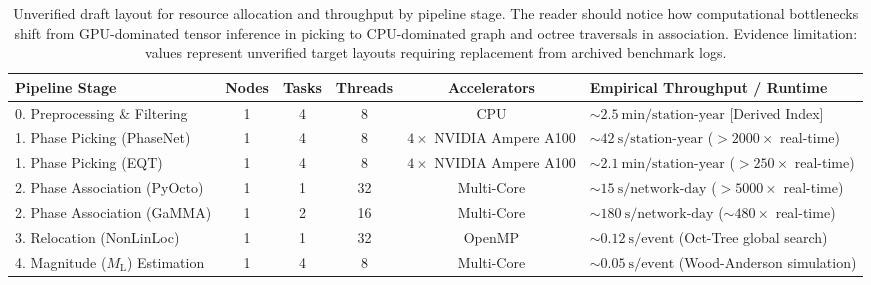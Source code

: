 \begin{landscape}
  \begin{table}[htbp]
    \centering
    \small
    \caption{Unverified draft layout for resource allocation and
      throughput by pipeline stage. The reader should notice how computational
      bottlenecks shift from \ac{GPU}-dominated tensor inference in picking to
      \ac{CPU}-dominated graph and octree traversals in association. Evidence
      limitation: values represent unverified target layouts
      requiring replacement
    from archived benchmark logs.}
    \label{tab:stage_benchmarks}
    \begin{threeparttable}
      \begin{tabularx}{\linewidth}{l c c c c X}
        \toprule
        \textbf{Pipeline Stage} & \textbf{Nodes} & \textbf{Tasks} &
        \textbf{Threads} & \textbf{Accelerators} & \textbf{Empirical
        Throughput / Runtime\tnote{a}} \\
        \midrule
        0. Preprocessing \& Filtering & \num{1} & \num{4} & \num{8}
        & \ac{CPU} & $\sim
        \qty{2.5}{\minute} / \text{station-year}$ [Derived Index] \\
        1. Phase Picking (\ac{PhaseNet}) & \num{1} & \num{4} &
        \num{8} & $\num{4} \times $  NVIDIA Ampere A100 &
        $\sim \qty{42}{\second} / \text{station-year}$ ($> \num{2000} \times $
        real-time) \\
        1. Phase Picking (\ac{EQT}) & \num{1} & \num{4} & \num{8} &
        $\num{4} \times $  NVIDIA Ampere A100
        & $\sim \qty{2.1}{\minute} / \text{station-year}$ ($>
        \num{250} \times $ real-time) \\
        2. Phase Association (\ac{PyOcto}) & \num{1} & \num{1} &
        \num{32} & Multi-Core &
        $\sim \qty{15}{\second} / \text{network-day}$ ($> \num{5000} \times $
        real-time) \\
        2. Phase Association (\ac{GaMMA}) & \num{1} & \num{2} &
        \num{16} & Multi-Core & $\sim
        \qty{180}{\second} / \text{network-day}$ ($\sim \num{480} \times $
        real-time) \\
        3. Relocation (\ac{NonLinLoc}) & \num{1} & \num{1} &
        \num{32} & OpenMP & $\sim
        \qty{0.12}{\second} / \text{event}$ (Oct-Tree global search) \\
        4. Magnitude ($M_{\mathrm{L}}$) Estimation & \num{1} &
        \num{4} & \num{8} & Multi-Core &
        $\sim \qty{0.05}{\second} / \text{event}$ (Wood-Anderson simulation) \\

\end{tabularx}
\end{threeparttable}
\end{table}
\end{landscape}
